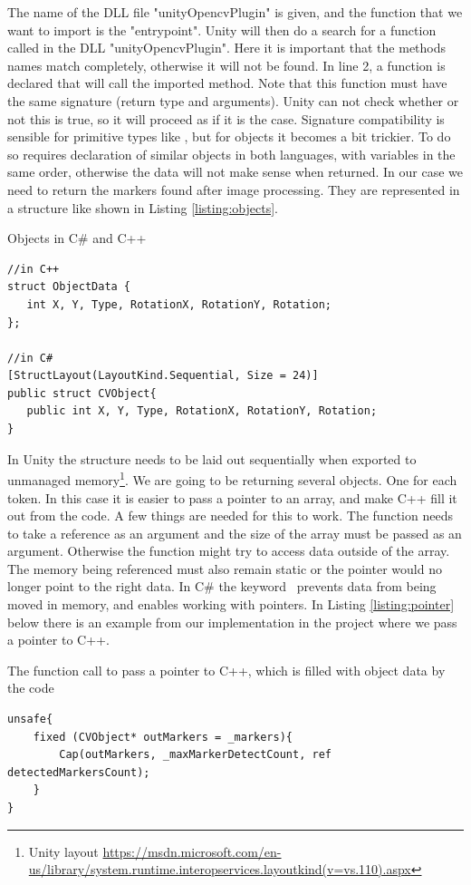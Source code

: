 The name of the DLL file "unityOpencvPlugin" is given, and the function that we want to import is the "entrypoint". Unity will then do a search for a function called  in the DLL "unityOpencvPlugin". Here it is important that the methods names match completely, otherwise it will not be found. In line 2, a function is declared that will call the imported method. Note that this function must have the same signature (return type and arguments). Unity can not check whether or not this is true, so it will proceed as if it is the case. Signature compatibility is sensible for primitive types like , but for objects it becomes a bit trickier. To do so requires declaration of similar objects in both languages, with variables in the same order, otherwise the data will not make sense when returned. In our case we need to return the markers found after image processing. They are represented in a structure like shown in Listing \ref{listing:objects}. 
\begin{listing}[H]
	\caption{Objects in C\# and C++}
	\label{listing:objects}
	\begin{verbatim}
//in C++
struct ObjectData {
   int X, Y, Type, RotationX, RotationY, Rotation;
};

//in C#	
[StructLayout(LayoutKind.Sequential, Size = 24)]
public struct CVObject{
   public int X, Y, Type, RotationX, RotationY, Rotation;
}
	\end{verbatim}
\end{listing}
In Unity the structure needs to be laid out sequentially when exported to unmanaged memory\footnote{Unity layout \url{https://msdn.microsoft.com/en-us/library/system.runtime.interopservices.layoutkind(v=vs.110).aspx}}. We are going to be returning several objects. One for each token. In this case it is easier to pass a pointer to an array, and make C++ fill it out from the code. A few things are needed for this to work. The function needs to take a reference as an argument and the size of the array must be passed as an argument. Otherwise the function might try to access data outside of the array. The memory being referenced must also remain static or the pointer would no longer point to the right data. In C\# the keyword  prevents data from being moved in memory, and  enables working with pointers. In Listing \ref{listing:pointer} below there is an example from our implementation in the project where we pass a pointer to C++. %
\begin{listing}[H]
\caption{The function call to pass a pointer to C++, which is filled with object data by the code}
\label{listing:pointer}
\begin{verbatim}
unsafe{
	fixed (CVObject* outMarkers = _markers){
		Cap(outMarkers, _maxMarkerDetectCount, ref detectedMarkersCount);
	}
}
\end{verbatim}
\end{listing}

